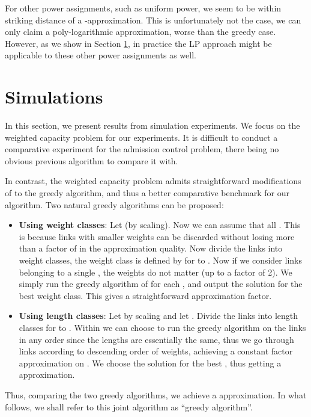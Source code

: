 \documentclass[11pt]{amsart}
\begin{document}
For other power assignments, such as uniform power, we seem to be within striking distance of a -approximation.
This is unfortunately not the case, we can only claim a poly-logarithmic approximation, worse than the greedy case. However, as
we show in Section \ref{sec:simul}, in practice the LP approach might be applicable to these other power assignments as well.



\section{Simulations}
\label{sec:simul}
In this section, we present results from simulation experiments. We focus on the weighted capacity problem for our experiments. It is difficult to conduct a comparative experiment for the admission control problem, there being no obvious previous algorithm to compare it with.

In contrast, the weighted capacity problem admits straightforward modifications of to the greedy algorithm, and thus a better comparative benchmark for our algorithm. Two natural greedy algorithms can be proposed:

\begin{itemize}
\item {\bf Using weight classes}: Let  (by scaling). Now we can assume that all . This is because links with smaller weights can be discarded without losing more than a factor of  in the approximation quality. Now divide the links into
 weight classes, the weight class  is defined by  for  to . Now if we consider links belonging to a single , the weights do not matter (up to a factor of 2). We simply run the greedy algorithm of \cite{SODA11} for each , and output the solution for the best weight class. This gives a straightforward  approximation factor.
\item {\bf Using length classes}: Let  by scaling and let . Divide the links
into length classes  for  to . Within  we can choose to run the greedy algorithm on the links in any order since the lengths are essentially the same, thus we go through links according to descending order of weights, achieving a constant factor approximation on . We choose the solution for the best , thus getting a  approximation.
\end{itemize}
Thus, comparing the two greedy algorithms, we achieve a  approximation. In what follows, we shall refer to
this joint algorithm as 
``greedy algorithm''.
\end{document}
